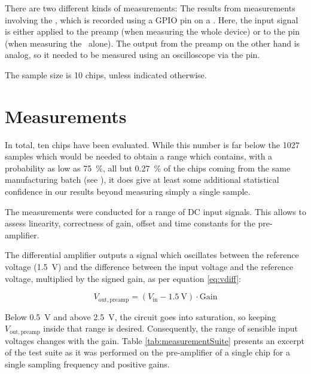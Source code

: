 There are two  different kinds of measurements: The  results from measurements
involving the \sdm, which is recorded using a GPIO pin on a \raspi.  Here, the
input signal is either applied to the preamp (when measuring the whole device)
or to  the   pin (when measuring the  \sdm~alone). The output
from the preamp on the other hand is analog, so it needed to be measured using
an oscilloscope via the  pin.

The sample size is 10 chips, unless indicated otherwise.


\section{Measurements}
\label{sec:measurements}

In total,  ten chips have been  evaluated. While this number is  far below the
\num{1027} samples  which would be  needed to  obtain a range  which contains,
with a probability as low as \SI{75}{\percent}, all but \SI{0.27}{\percent} of
the chips coming from the same manufacturing batch (see \cite{ref:3sfall}), it
does  give at  least some  additional  statistical confidence  in our  results
beyond measuring simply a single sample.

The  measurements  were conducted for a range of DC input signals. This allows
to assess linearity, correctness of gain, offset and  time  constants  for the
pre-amplifier.

The  differential amplifier  outputs  a signal  which  oscillates between  the
reference  voltage  (\SI{1.5}{\volt}) and  the  difference  between the  input
voltage  and the  reference voltage,  multiplied by  the signed  gain, as  per
equation \ref{eq:vdiff}:

\begin{equation}
    \label{eq:vdiff}
    V_{\mathrm{out, preamp}} = ( V_{\mathrm{in}} - \SI{1.5}{\volt} ) \cdot \mathrm{Gain}
\end{equation}

Below  \SI{0.5}{\volt}  and  above  \SI{2.5}{\volt},  the  circuit  goes  into
saturation,  so  keeping  $V_{\mathrm{out,  preamp}}$  inside  that  range  is
desired. Consequently, the range  of sensible input voltages  changes with the
gain. Table \ref{tab:measurementSuite}  presents an excerpt of  the test suite
as  it was  performed on  the  pre-amplifier of  a  single chip  for a  single
sampling frequency and positive gains.


